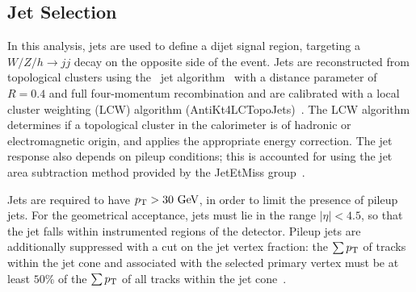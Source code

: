\subsection{Jet Selection}\label{sec:jet-selection}
In this analysis, jets are used to define a dijet signal region, targeting a $W/Z/h\rightarrow jj$ decay on the opposite side of the event. Jets are reconstructed from topological clusters using the \antikt\ jet algorithm~\cite{Cacciari:2008gp} with a distance parameter of $R = 0.4$ and full four-momentum recombination and are calibrated with a local cluster weighting (LCW) algorithm ({AntiKt4LCTopoJets})~\cite{ATLAS-CONF-2010-053}. The LCW algorithm determines if a topological cluster in the calorimeter is of hadronic or electromagnetic origin, and applies the appropriate energy correction. The jet response also depends on pileup conditions; this is accounted for using the jet area subtraction method provided by the JetEtMiss group~\cite{JetEtmissRecommendations2012}.

Jets are required to have $p_{\text{T}}>30~\mbox{GeV}$, in order to limit the presence of pileup jets. For the geometrical acceptance, jets must lie in the range $|\eta|<4.5$, so that the jet falls within instrumented regions of the detector. Pileup jets are additionally suppressed with a cut on the jet vertex fraction: the $\sum p_{\text{T}}$ of tracks within the jet cone and associated with the selected primary vertex must be at least $50\%$ of the $\sum p_{\text{T}}$ of all tracks within the jet cone~\cite{jvf}. 


%
%
%
%

